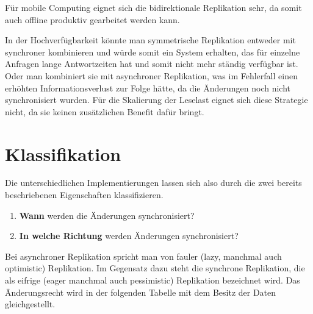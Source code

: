 Für mobile Computing eignet sich die bidirektionale Replikation sehr, da somit auch offline produktiv gearbeitet werden kann.

In der Hochverfügbarkeit könnte man symmetrische Replikation entweder mit synchroner kombinieren und würde somit ein System erhalten, das für einzelne Anfragen lange Antwortzeiten hat und somit nicht mehr ständig verfügbar ist. Oder man kombiniert sie mit asynchroner Replikation, was im Fehlerfall einen erhöhten Informationsverlust zur Folge hätte, da die Änderungen noch nicht synchronisiert wurden. Für die Skalierung der Leselast eignet sich diese Strategie nicht, da sie keinen zusätzlichen Benefit dafür bringt.
\clearpage
\section{Klassifikation}

Die unterschiedlichen Implementierungen lassen sich also durch die zwei bereits beschriebenen Eigenschaften klassifizieren.

\begin{enumerate}
	\item \textbf{Wann} werden die Änderungen synchronisiert?
	\item \textbf{In welche Richtung} werden Änderungen synchronisiert?
\end{enumerate}

Bei asynchroner Replikation spricht man von fauler (lazy, manchmal auch optimistic) Replikation. Im Gegensatz dazu steht die synchrone Replikation, die als eifrige (eager manchmal auch pessimistic) Replikation bezeichnet wird. Das Änderungsrecht wird in der folgenden Tabelle mit dem Besitz der Daten gleichgestellt. \cite{kaiserslautern}

